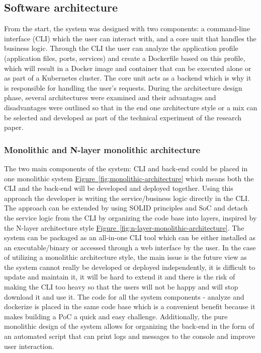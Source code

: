 \documentclass{article}
\newcommand{\FigRef}[1]{\hyperref[#1]{Figure~\ref{#1}}}
\begin{document}
\begin{multicols}{2}
\subsection{Software architecture}
From the start, the system was designed with two components: a command-line interface (CLI) which the user can interact with, and a core unit that handles the business logic. Through the CLI the user can analyze the application profile (application files, ports, services) and create a Dockerfile based on this profile, which will result in a Docker image and container that can be executed alone or as part of a Kubernetes cluster. The core unit acts as a backend which is why it is responsible for handling the user's requests.
During the architecture design phase, several architectures were examined and their advantages and disadvantages were outlined so that in the end one architecture style or a mix can be selected and developed as part of the technical experiment of the research paper.

\subsubsection{Monolithic and N-layer monolithic architecture}
The two main components of the system: CLI and back-end could be placed in one monolithic system \FigRef{fig:monolithic-architecture} which means both the CLI and the back-end will be developed and deployed together. Using this approach the developer is writing the service/business logic directly in the CLI. The approach can be extended by using SOLID principles and SoC and detach the service logic from the CLI by organizing the code base into layers, inspired by the N-layer architecture style \FigRef{fig:n-layer-monolithic-architecture}. The system can be packaged as an all-in-one CLI tool which can be either installed as an executable/binary or accessed through a web interface by the user. In the case of utilizing a monolithic architecture style, the main issue is the future view as the system cannot really be developed or deployed independently, it is difficult to update and maintain it, it will be hard to extend it and there is the risk of making the CLI too heavy so that the users will not be happy and will stop download it and use it. The code for all the system components - analyze and dockerize is placed in the same code base which is a convenient benefit because it makes building a PoC a quick and easy challenge. Additionally, the pure monolithic design of the system allows for organizing the back-end in the form of an automated script that can print logs and messages to the console and improve user interaction.


\end{multicols}
\end{document}
